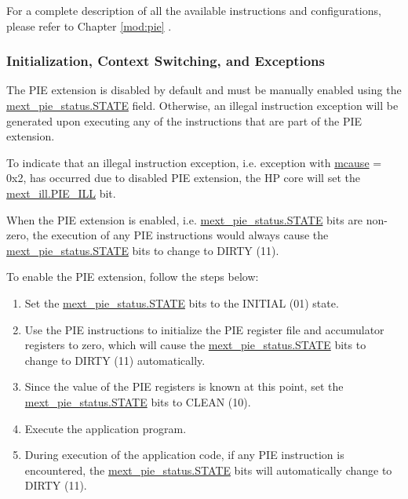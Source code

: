\documentclass[main\_\_EN.tex]{subfiles}
\begin{document}
For a complete description of all the available instructions and configurations, please refer to Chapter \ref{mod:pie} \textit{}.

\subsubsection{Initialization, Context Switching, and Exceptions}
\label{sec:riscvcpu-pie-init}

The PIE extension is disabled by default and must be manually enabled using the \hyperref[fielddesc:MEXT_PIE_STATE]{mext\_pie\_status.STATE} field. Otherwise, an illegal instruction exception will be generated upon executing any of the instructions that are part of the PIE extension.

To indicate that an illegal instruction exception, i.e. exception with \hyperref[regdesc:MCAUSE]{mcause} = 0x2, has occurred due to disabled PIE extension, the HP core will set the \hyperref[fielddesc:MEXT_ILL_PIE_ILL]{mext\_ill.PIE\_ILL} bit.

When the PIE extension is enabled, i.e. \hyperref[fielddesc:MEXT_PIE_STATE]{mext\_pie\_status.STATE} bits are non-zero, the execution of any PIE instructions would always cause the \hyperref[fielddesc:MEXT_PIE_STATE]{mext\_pie\_status.STATE} bits to change to DIRTY (11).

To enable the PIE extension, follow the steps below:

\begin{enumerate}
    \item Set the \hyperref[fielddesc:MEXT_PIE_STATE]{mext\_pie\_status.STATE} bits to the INITIAL (01) state.
    \item Use the PIE instructions to initialize the PIE register file and accumulator registers to zero, which will cause the \hyperref[fielddesc:MEXT_PIE_STATE]{mext\_pie\_status.STATE} bits to change to DIRTY (11) automatically.
    \item Since the value of the PIE registers is known at this point, set the \hyperref[fielddesc:MEXT_PIE_STATE]{mext\_pie\_status.STATE} bits to CLEAN (10).
    \item Execute the application program.
    \item During execution of the application code, if any PIE instruction is encountered, the \hyperref[fielddesc:MEXT_PIE_STATE]{mext\_pie\_status.STATE} bits will automatically change to DIRTY (11).
\end{enumerate}
\end{document}
